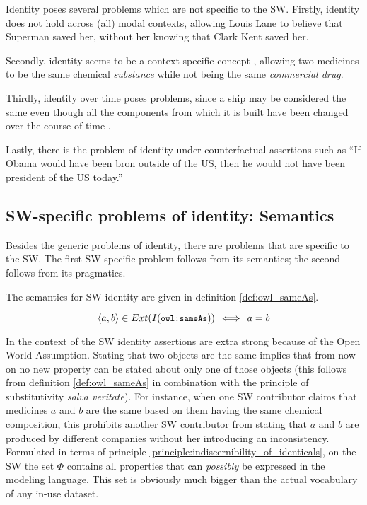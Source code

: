 Identity poses several problems which are not specific to the SW.
Firstly, identity does not hold across (all) modal contexts,
  allowing Louis Lane to believe that Superman saved her,
  without her knowing that Clark Kent saved her.

Secondly, identity seems to be a context-specific concept \cite{Geach1967},
  allowing two medicines to be the same chemical \emph{substance}
  while not being the same \emph{commercial drug}.

Thirdly, identity over time poses problems,
  since a ship may be considered the same
  even though all the components from which it is built
  have been changed over the course of time \cite{Lewis1986}.

Lastly, there is the problem of identity under counterfactual assertions
  such as ``If Obama would have been bron outside of the US,
  then he would not have been president of the US today.''\cite{Kripke1980}

\subsection{SW-specific problems of identity: Semantics}

Besides the generic problems of identity,
  there are problems that are specific to the SW.
The first SW-specific problem follows from its semantics;
  the second follows from its pragmatics.

The semantics for SW identity are given in definition \ref{def:owl_sameAs}.

\begin{definition}
\label{def:owl_sameAs}
\begin{equation}
    \langle a, b \rangle \in Ext(I({\small \texttt{owl:sameAs}}))
  \,\iff\,
    a = b\nonumber
\end{equation}
\end{definition}

\noindent In the context of the SW identity assertions are extra strong
  because of the Open World Assumption.
Stating that two objects are the same
  implies that from now on no new property can be stated about
  only one of those objects
  (this follows from definition \ref{def:owl_sameAs} in combination with
  the principle of substitutivity \emph{salva veritate}).
For instance, when one SW contributor claims that
  medicines $a$ and $b$ are the same
  based on them having the same chemical composition,
  this prohibits another SW contributor from stating that
  $a$ and $b$ are produced by different companies
  without her introducing an inconsistency.
Formulated in terms of
  principle \ref{principle:indiscernibility_of_identicals},
  on the SW the set $\Phi$ contains
  all properties that can \emph{possibly} be expressed
  in the modeling language.
This set is obviously much bigger than the actual vocabulary
  of any in-use dataset.

